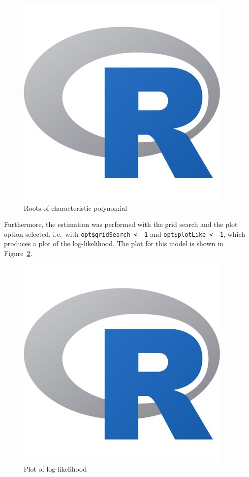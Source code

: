 \documentclass[article]{jss}
\begin{document}
\begin{figure}[H]
  \centering
  \caption{Roots of characteristic polynomial}
  \label{fig:Roots}
  \includegraphics[scale = .6, keepaspectratio=true]{Figures/roots.png}
\end{figure}

Furthermore, the estimation was performed with the grid search and the plot option selected, i.e.\ with \verb|opt$gridSearch <- 1| and \verb|opt$plotLike <- 1|, which produces a plot of the log-likelihood. The plot for this model is shown in Figure~\ref{fig:m1_likelihood}.

\begin{figure}[H]
  \centering
  \caption{Plot of log-likelihood}
  \label{fig:m1_likelihood}
  \includegraphics[scale = .6, keepaspectratio=true]{Figures/m1_likelihood.png}
\end{figure}
\end{document}
